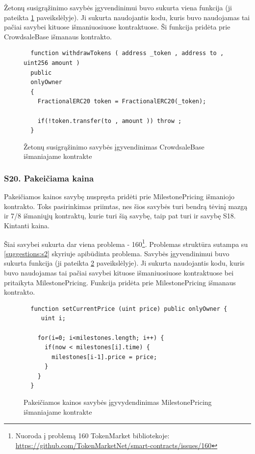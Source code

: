 \documentclass{VUMIFPSbakalaurinis}
\begin{document}
Žetonų susigrąžinimo savybės įgyvendinimui buvo sukurta viena funkcija (ji pateikta \ref{code:s2} paveikslėlyje). Ji sukurta naudojantis kodu, kuris buvo naudojamas tai pačiai savybei kituose išmaniuosiuose kontraktuose. Ši funkcija pridėta prie CrowdsaleBase išmanaus kontrakto.


\begin{figure}[H]
    \small
	\begin{lstlisting}
  function withdrawTokens ( address _token , address to , uint256 amount )
  public
  onlyOwner
  {
    FractionalERC20 token = FractionalERC20(_token);

    if(!token.transfer(to , amount )) throw ;
  }
\end{lstlisting}
	\caption{Žetonų susigrąžinimo savybės įgyvendinimas CrowdsaleBase išmaniajame kontrakte}
	\label{code:s2}
\end{figure}

\subsubsection{S20. Pakeičiama kaina}

Pakeičiamos kainos savybę nuspręsta pridėti prie MilestonePricing išmaniojo kontrakto. Toks pasirinkimas priimtas, nes šios savybės turi bendrą tėvinį mazgą ir 7/8 išmaniųjų kontraktų, kurie turi šią savybę, taip pat turi ir savybę S18. Kintanti kaina.

Šiai savybei sukurta dar viena problema - 160\footnote{Nuoroda į problemą 160 TokenMarket bibliotekoje: \url{https://github.com/TokenMarketNet/smart-contracts/issues/160}}. Problemas struktūra sutampa su \ref{suggestions:s2} skyriuje apibūdinta problema. Savybės įgyvendinimui buvo sukurta funkcija (ji pateikta \ref{code:s20} paveikslėlyje). Ji sukurta naudojantis kodu, kuris buvo naudojamas tai pačiai savybei kituose išmaniuosiuose kontraktuose bei pritaikyta MilestonePricing. Funkcija pridėta prie MilestonePricing išmanaus kontrakto.

\begin{figure}[H]
    \small
	\begin{lstlisting}
  function setCurrentPrice (uint price) public onlyOwner {
     uint i;

    for(i=0; i<milestones.length; i++) {
      if(now < milestones[i].time) {
        milestones[i-1].price = price;
      }
    }
  }
\end{lstlisting}
	\caption{Pakeičiamos kainos savybės įgyvydendinimas MilestonePricing išmaniajame kontrakte}
	\label{code:s20}
\end{figure}
\end{document}
